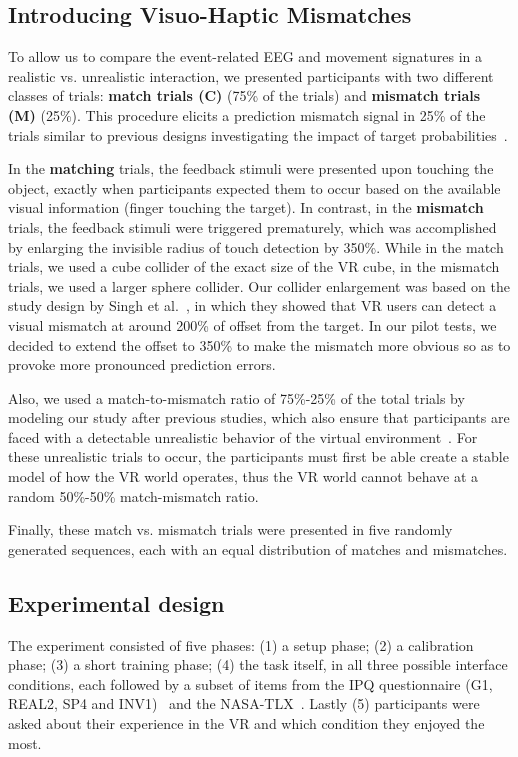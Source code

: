 \subsection{Introducing Visuo-Haptic Mismatches}
To allow us to compare the event-related EEG and movement signatures in a realistic vs. unrealistic interaction, we presented participants with two different classes of trials: \textbf{match trials (C)} (75\% of the trials) and \textbf{mismatch trials (M)} (25\%). This procedure elicits a prediction mismatch signal in 25\% of the trials similar to previous designs investigating the impact of target probabilities~\cite{polich_updating_2007}.  %

In the \textbf{matching} trials, the feedback stimuli were presented upon touching the object, exactly when participants expected them to occur based on the available visual information (finger touching the target). In contrast, in the \textbf{mismatch} trials, the feedback stimuli were triggered prematurely, which was accomplished by enlarging the invisible radius of touch detection by 350\%. While in the match trials, we used a cube collider of the exact size of the VR cube, in the mismatch trials, we used a larger sphere collider. Our collider enlargement was based on the study design by Singh et al.~\cite{singh_visual_20008}, in which they showed that VR users can detect a visual mismatch at around 200\% of offset from the target. In our pilot tests, we decided to extend the offset to 350\% to make the mismatch more obvious so as to provoke more pronounced prediction errors. 

Also, we used a match-to-mismatch ratio of 75\%-25\% of the total trials by modeling our study after previous studies, which also ensure that participants are faced with a detectable unrealistic behavior of the virtual environment~\cite{Liao2011,Wiersema2007,Donchin1988}. For these unrealistic trials to occur, the participants must first be able create a stable model of how the VR world operates, thus the VR world cannot behave at a random 50\%-50\% match-mismatch ratio. 

Finally, these match vs. mismatch trials were presented in five randomly generated sequences, each with an equal distribution of matches and mismatches.

\subsection{Experimental design}
The experiment consisted of five phases: (1) a setup phase; (2) a calibration phase; (3) a short training phase; (4) the task itself, in all three possible interface conditions, each followed by a subset of items from the IPQ questionnaire (G1, REAL2, SP4 and INV1)~\cite{T.W.Schubert2003} and the NASA-TLX~\cite{Hart1988}. Lastly (5) participants were asked about their experience in the VR and which condition they enjoyed the most.

